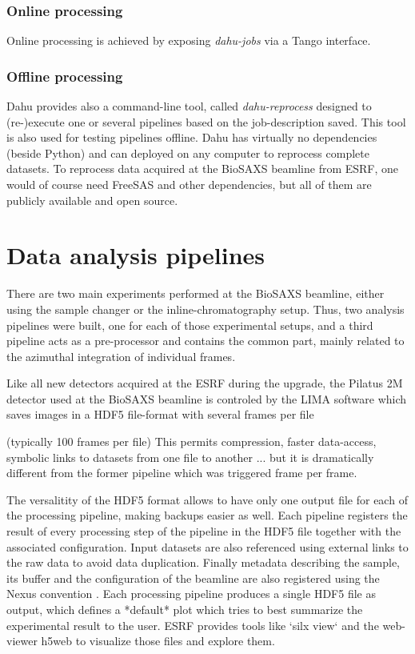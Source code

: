 \documentclass[preprint]{iucr}              %
\begin{document}
\subsubsection{Online processing}
Online processing is achieved by exposing \textit{dahu-jobs} via a Tango interface.

\subsubsection{Offline processing}
Dahu provides also a command-line tool, called \textit{dahu-reprocess} designed to (re-)execute one or several pipelines based on the job-description saved. 
This tool is also used for testing pipelines offline.
Dahu has virtually no dependencies (beside Python) and can deployed on any computer to reprocess complete datasets. 
To reprocess data acquired at the BioSAXS beamline from ESRF, one would of course need FreeSAS and other dependencies, but all of them are publicly available and open source.

\section{Data analysis pipelines}

There are two main experiments performed at the BioSAXS beamline, either using the sample changer or the inline-chromatography setup.
Thus, two analysis pipelines were built, one for each of those experimental setups, and a third pipeline acts as a pre-processor and contains the common part, 
mainly related to the azimuthal integration of individual frames.

Like all new detectors acquired at the ESRF during the upgrade, the Pilatus 2M detector used at the BioSAXS beamline is controled by the LIMA \cite{lima} 
software which saves images in a HDF5 file-format \cite{hdf5} with several frames per file

 (typically 100 frames per file)
This permits compression, faster data-access, symbolic links to datasets from one file to another ... but it is dramatically different from the former pipeline which was triggered frame per frame.

The versalitity of the HDF5 format allows to have only one output file for each of the processing pipeline, making backups easier as well. 
Each pipeline registers the result of every processing step of the pipeline in the HDF5 file together with the associated configuration.
Input datasets are also referenced using external links to the raw data to avoid data duplication. 
Finally metadata describing the sample, its buffer and the configuration of the beamline are also registered using the Nexus convention \cite{nexus}.
Each processing pipeline produces a single HDF5 file as output, which defines a *default* plot which tries to best summarize the experimental result to the user.
ESRF provides tools like `silx view` \cite{silx}  and the web-viewer h5web \cite{silx} to visualize those files and explore them.
\end{document}
